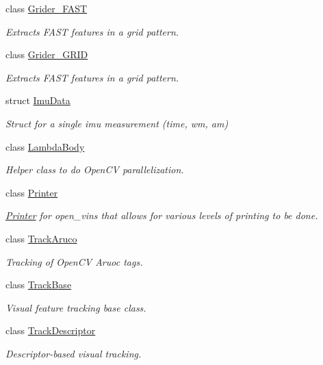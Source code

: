 \begin{DoxyCompactItemize}
class \hyperlink{classov__core_1_1Grider__FAST}{Grider\+\_\+\+F\+A\+ST}
\begin{DoxyCompactList}\small\item\em Extracts F\+A\+ST features in a grid pattern. \end{DoxyCompactList}\item 
class \hyperlink{classov__core_1_1Grider__GRID}{Grider\+\_\+\+G\+R\+ID}
\begin{DoxyCompactList}\small\item\em Extracts F\+A\+ST features in a grid pattern. \end{DoxyCompactList}\item 
struct \hyperlink{structov__core_1_1ImuData}{Imu\+Data}
\begin{DoxyCompactList}\small\item\em Struct for a single imu measurement (time, wm, am) \end{DoxyCompactList}\item 
class \hyperlink{classov__core_1_1LambdaBody}{Lambda\+Body}
\begin{DoxyCompactList}\small\item\em Helper class to do Open\+CV parallelization. \end{DoxyCompactList}\item 
class \hyperlink{classov__core_1_1Printer}{Printer}
\begin{DoxyCompactList}\small\item\em \hyperlink{classov__core_1_1Printer}{Printer} for open\+\_\+vins that allows for various levels of printing to be done. \end{DoxyCompactList}\item 
class \hyperlink{classov__core_1_1TrackAruco}{Track\+Aruco}
\begin{DoxyCompactList}\small\item\em Tracking of Open\+CV Aruoc tags. \end{DoxyCompactList}\item 
class \hyperlink{classov__core_1_1TrackBase}{Track\+Base}
\begin{DoxyCompactList}\small\item\em Visual feature tracking base class. \end{DoxyCompactList}\item 
class \hyperlink{classov__core_1_1TrackDescriptor}{Track\+Descriptor}
\begin{DoxyCompactList}\small\item\em Descriptor-\/based visual tracking. \end{DoxyCompactList}\item 

\end{DoxyCompactItemize}
